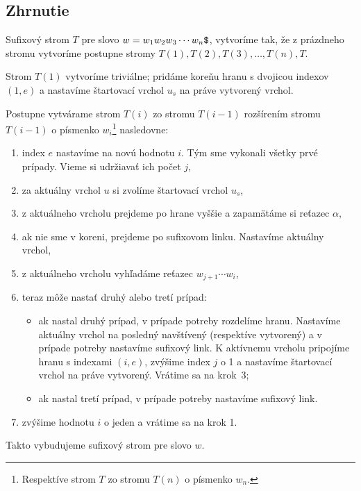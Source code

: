 \subsection{Zhrnutie}

Sufixový strom $T$ pre slovo $w = w_1w_2w_3\cdots w_n\hbox{\tt\$}$, vytvoríme tak, že z 
prázdneho stromu vytvoríme postupne stromy $T(1), T(2), T(3),\ldots, T(n), T$. 

Strom $T(1)$ vytvoríme triviálne; pridáme koreňu hranu s dvojicou indexov 
$(1, e)$ a nastavíme štartovací vrchol $u_s$ na práve vytvorený vrchol.

Postupne vytvárame strom $T(i)$ zo stromu $T(i-1)$ rozšírením stromu 
$T(i-1)$ o písmenko $w_i$\footnote{Respektíve strom $T$ zo stromu 
$T(n)$ o písmenko $w_n$.} nasledovne:

\begin{enumerate}
\item index $e$ nastavíme na novú hodnotu $i$. 
Tým sme vykonali všetky prvé prípady. Vieme si udržiavať ich počet $j$,
\item za aktuálny vrchol $u$ si zvolíme štartovací vrchol $u_s$,
\item z aktuálneho vrcholu prejdeme po hrane vyššie a zapamätáme si reťazec 
$\alpha$,
\item ak nie sme v koreni, prejdeme po sufixovom linku. Nastavíme aktuálny 
vrchol,
\item z aktuálneho vrcholu vyhľadáme reťazec $w_{j+1}\cdots w_i$,
\item teraz môže nastať druhý alebo tretí prípad:
\begin{itemize}
\item ak nastal druhý prípad, v prípade potreby rozdelíme hranu. Nastavíme 
aktuálny vrchol na posledný navštívený (respektíve vytvorený) a v prípade 
potreby nastavíme sufixový link. K aktívnemu vrcholu pripojíme hranu s 
indexami $(i,e)$, zvýšime index $j$ o 1 a nastavíme štartovací vrchol na 
práve vytvorený. Vrátime sa na krok~3;
\item ak nastal tretí prípad, v prípade potreby nastavíme sufixový link.
\end{itemize}
\item zvýšime hodnotu $i$ o jeden a vrátime sa na krok 1.
\end{enumerate}
 
Takto vybudujeme sufixový strom pre slovo $w$.

